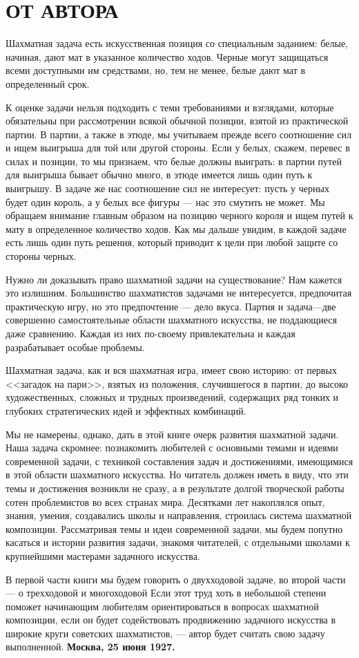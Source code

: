 \chapter*{ОТ АВТОРА}
Шахматная задача есть искусственная позиция со специальным заданием: белые, начиная, дают мат в указанное количество ходов. Черные могут защищаться всеми доступными им средствами, но, тем не менее, белые дают мат в определенный срок.

К оценке задачи нельзя подходить с теми требованиями и взглядами, которые обязательны при рассмотрении всякой обычной позиции, взятой из практической партии. В партии, а также в этюде, мы учитываем прежде всего соотношение сил и ищем выигрыша для той или другой стороны. Если у белых, скажем, перевес в силах и позиции, то мы признаем, что белые должны выиграть: в партии путей для выигрыша бывает обычно много, в этюде имеется лишь один путь к выигрышу. В задаче же нас соотношение сил не интересует: пусть у черных будет один король, а у белых все фигуры — нас это смутить не может. Мы обращаем внимание главным образом на позицию черного короля и ищем путей к мату в определенное количество ходов. Как мы дальше увидим, в каждой задаче есть лишь один путь решения, который приводит к цели при любой защите со стороны черных.

Нужно ли доказывать право шахматной задачи на существование? Нам кажется это излишним. Большинство шахматистов задачами не интересуется, предпочитая практическую игру, но это предпочтение — дело вкуса. Партия и задача—две совершенно самостоятельные области шахматного искусства, не поддающиеся даже сравнению. Каждая из них по-своему привлекательна и каждая разрабатывает особые проблемы.

Шахматная задача, как и вся шахматная игра, имеет свою историю: от первых <<загадок на пари>>, взятых из положения, случившегося в партии, до высоко художественных, сложных и трудных произведений, содержащих ряд тонких и глубоких стратегических идей и эффектных комбинаций.

Мы не намерены, однако, дать в этой книге очерк развития шахматной задачи. Наша задача скромнее: познакомить любителей с основными темами и идеями современной задачи, с техникой составления задач и достижениями, имеющимися в этой области шахматного искусства. Но читатель должен иметь в виду, что эти темы и достижения возникли не сразу, а в результате долгой творческой работы сотен проблемистов во всех странах мира. Десятками лет накоплялся опыт, знания, умения, создавались школы и направления, строилась система шахматной композиции. Рассматривая темы и идеи современной задачи, мы будем попутно касаться и истории развития задачи, знакомя читателей, с отдельными школами к крупнейшими мастерами задачного искусства.

В первой части книги мы будем говорить о двухходовой задаче, во второй части — о трехходовой и многоходовой
Если этот труд хоть в небольшой степени поможет начинающим любителям ориентироваться в вопросах шахматной композиции, если он будет содействовать продвижению задачного искусства в широкие круги советских шахматистов, — автор будет считать свою задачу выполненной.
\newline\newline
\textbf{Москва, 25 июня 1927.}
